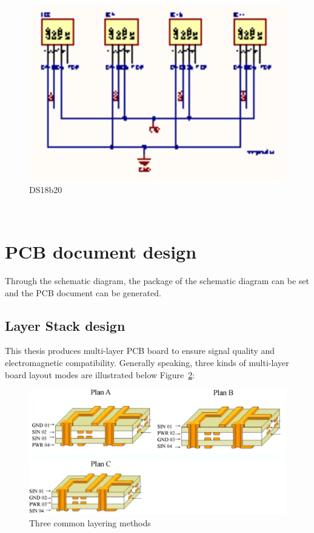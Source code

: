 \begin{figure}[!ht]
	\centering
	\includegraphics[width=16cm]{grafiken/ds18b20.eps}
	\caption{DS18b20} 
	\label{fig:6.9}
\end{figure}
\FloatBarrier
\\



\section{PCB document design}
\label{sec:PCB document design}
Through the schematic diagram, the package of the schematic diagram can be set and the PCB document can be generated.


\subsection{Layer Stack design}
\label{sec:Layer Stack design}

This thesis produces multi-layer PCB board to ensure signal quality and electromagnetic compatibility. Generally speaking, three kinds of multi-layer board layout modes are illustrated below Figure~\ref{fig:6.10}:
\begin{figure}[!ht]
	\centering
	\includegraphics[width=16cm]{grafiken/6.10.eps}
	\caption{Three common layering methods} 
	\label{fig:6.10}
\end{figure}
\FloatBarrier
\\

